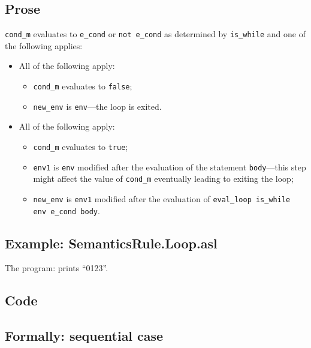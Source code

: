 \documentclass{book}
\begin{document}
    \subsection{Prose}
    \texttt{cond\_m} evaluates to \texttt{e\_cond} or \texttt{not e\_cond} as
determined by \texttt{is\_while} and one of the following applies:
    \begin{itemize}
    \item All of the following apply:
      \begin{itemize}
      \item \texttt{cond\_m} evaluates to \texttt{false};
      \item \texttt{new\_env} is \texttt{env}---the loop is exited. 
      \end{itemize}
    \item All of the following apply:
      \begin{itemize}
      \item \texttt{cond\_m} evaluates to \texttt{true};
      \item \texttt{env1} is \texttt{env} modified after the evaluation of the
statement \texttt{body}---this step might affect the value of \texttt{cond\_m}
eventually leading to exiting the loop;
      \item \texttt{new\_env} is \texttt{env1} modified after the evaluation of
\texttt{eval\_loop is\_while env e\_cond body}.
      \end{itemize}
    \end{itemize}

    \subsection{Example: SemanticsRule.Loop.asl}
    The program:
    prints ``0123''.

    \subsection{Code}

  \subsection{Formally: sequential case}
  \begin{align}
  \end{align} 
\end{document}
